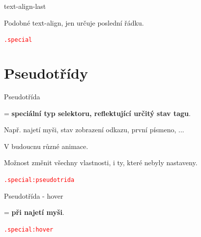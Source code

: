 \documentclass[aspectratio=1610]{beamer}
\begin{document}
\begin{frame}{text-align-last}
    \begin{cardTiny}
        Podobné text-align, jen určuje poslední řádku.

        \begin{alltt}
            \textcolor{red}{.special} \string{\\
                \textcolor{blue}{text-align}: \textcolor{orange}{justify};\\
                \textcolor{blue}{text-align-last}: \textcolor{orange}{right};\\
            \string}
        \end{alltt}
    \end{cardTiny}
\end{frame}


\section{Pseudotřídy}

\begin{frame}{Pseudotřída}
    \begin{cardTiny}
        \begin{flushleft}
            = \textbf{speciální typ selektoru, reflektující určitý stav tagu}.

            Např. najetí myši, stav zobrazení odkazu, první písmeno, ...

            V budoucnu různé animace.

            Možnost změnit všechny vlastnosti, i ty, které nebyly nastaveny.

            \begin{alltt}
                \textcolor{red}{.special:pseudotrida} \string{\\
                    \textcolor{gray}{/* styly */}\\
                \string}
            \end{alltt}
        \end{flushleft}
    \end{cardTiny}
\end{frame}

\begin{frame}{Pseudotřída - hover}
    \begin{cardTiny}
        \begin{flushleft}
            = \textbf{při najetí myši}.

            \begin{alltt}
                \textcolor{red}{.special:hover} \string{\\
                    \textcolor{gray}{/* styly */}\\
                \string}
            \end{alltt}
        \end{flushleft}
    \end{cardTiny}
\end{frame}
\end{document}
